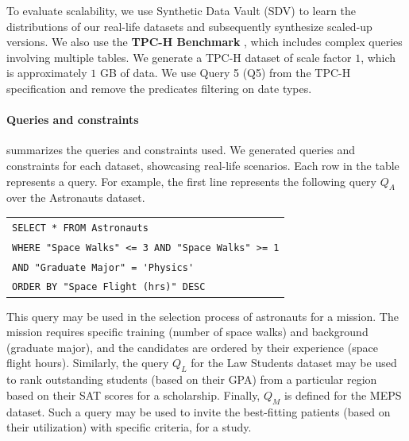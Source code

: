 To evaluate scalability, we use Synthetic Data Vault (SDV) \cite{SDV} to learn the distributions of our real-life datasets and subsequently synthesize scaled-up versions.
We also use the {\bf TPC-H Benchmark}%
, which includes complex queries involving multiple tables. We generate a TPC-H dataset of scale factor $1$, which is approximately $1$ GB of data. We use Query 5 (Q5) from the TPC-H specification and remove the predicates filtering on date types. 















\paragraph*{\textbf{Queries and constraints}} %
 summarizes the queries and constraints used.
 We generated queries and constraints for each dataset, showcasing real-life scenarios. Each row in the table represents a query. %
 For example, the first line represents the following query 
 $Q_A$ over the Astronauts dataset. 
 \begin{center}
     \footnotesize
     \begin{tabular}{l}
        \verb"SELECT * FROM Astronauts" \\
        \verb|WHERE "Space Walks" <= 3 AND "Space Walks" >= 1| \\
        \verb|AND "Graduate Major" = 'Physics'|\\
        \verb|ORDER BY "Space Flight (hrs)" DESC|\\
     \end{tabular}
     \end{center}
     This query may be used in the selection process of astronauts for a mission. The mission requires specific training (number of space walks) and background (graduate major), and the candidates are ordered by their experience (space flight hours).  
     Similarly, the query $Q_L$ for the Law Students dataset may be used to rank outstanding students (based on their GPA) from a particular region based on their SAT scores for a scholarship. Finally, $Q_M$ is defined for the MEPS dataset.  Such a query may be used to invite the best-fitting patients (based on their utilization) with specific criteria, for a study.
     
